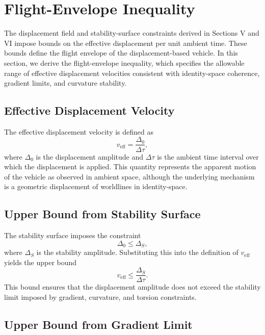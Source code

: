 \documentclass[aip,adv,reprint,floatfix]{revtex4-2}
\begin{document}
\section{Flight-Envelope Inequality}

The displacement field and stability-surface constraints derived in Sections V and VI impose bounds on the effective displacement per unit ambient time. These bounds define the flight envelope of the displacement-based vehicle. In this section, we derive the flight-envelope inequality, which specifies the allowable range of effective displacement velocities consistent with identity-space coherence, gradient limits, and curvature stability.

\subsection{Effective Displacement Velocity}

The effective displacement velocity is defined as
\begin{equation}
v_{\mathrm{eff}} = \frac{\Delta_0}{\Delta \tau},
\end{equation}
where $\Delta_0$ is the displacement amplitude and $\Delta \tau$ is the ambient time interval over which the displacement is applied. This quantity represents the apparent motion of the vehicle as observed in ambient space, although the underlying mechanism is a geometric displacement of worldlines in identity-space.

\subsection{Upper Bound from Stability Surface}

The stability surface imposes the constraint
\begin{equation}
\Delta_0 \leq \Delta_S,
\end{equation}
where $\Delta_S$ is the stability amplitude. Substituting this into the definition of $v_{\mathrm{eff}}$ yields the upper bound
\begin{equation}
v_{\mathrm{eff}} \leq \frac{\Delta_S}{\Delta \tau}.
\end{equation}
This bound ensures that the displacement amplitude does not exceed the stability limit imposed by gradient, curvature, and torsion constraints.

\subsection{Upper Bound from Gradient Limit}
\end{document}
